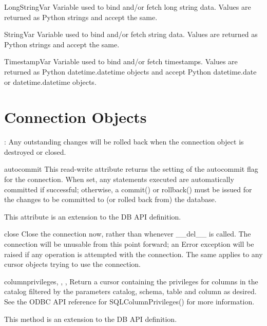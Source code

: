 \documentclass{manual}
\begin{document}
\begin{datadesc}{LongStringVar}
  Variable used to bind and/or fetch long string data. Values are returned as
  Python strings and accept the same.
\end{datadesc}

\begin{datadesc}{StringVar}
  Variable used to bind and/or fetch string data. Values are returned as Python
  strings and accept the same.
\end{datadesc}

\begin{datadesc}{TimestampVar}
  Variable used to bind and/or fetch timestamps. Values are returned as Python
  datetime.datetime objects and accept Python datetime.date or
  datetime.datetime objects.
\end{datadesc}

\chapter{Connection Objects\label{connobj}}

: Any outstanding changes will be rolled back when the connection
object is destroyed or closed.

\begin{datadesc}{autocommit}
  This read-write attribute returns the setting of the autocommit flag for the
  connection. When set, any statements executed are automatically committed
  if successful; otherwise, a commit() or rollback() must be issued for the
  changes to be committed to (or rolled back from) the database.

   This attribute is an extension to the DB API definition.
\end{datadesc}

\begin{funcdesc}{close}{}
  Close the connection now, rather than whenever __del__ is called. The
  connection will be unusable from this point forward; an Error exception will
  be raised if any operation is attempted with the connection. The same applies
  to any cursor objects trying to use the connection.
\end{funcdesc}

\begin{funcdesc}{columnprivileges}{, ,
    , }
  Return a cursor containing the privileges for columns in the catalog filtered
  by the parameters catalog, schema, table and column as desired. See the ODBC
  API reference for SQLColumnPrivileges() for more information.

   This method is an extension to the DB API definition.
\end{funcdesc}
\end{document}
